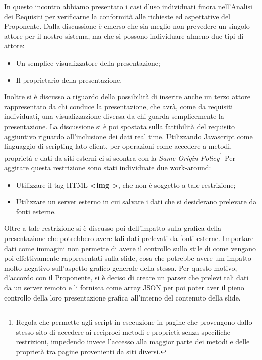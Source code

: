 In questo incontro abbiamo presentato i casi d'uso individuati finora nell'Analisi dei Requisiti per verificarne la conformità alle richieste ed aspettative del Proponente.
\noindent Dalla discussione è emerso che sia meglio non prevedere un singolo attore per il nostro sistema, ma che si possono individuare almeno due tipi di attore:
\begin{itemize}
	\item Un semplice visualizzatore della presentazione;
	\item Il proprietario della presentazione.
\end{itemize}
Inoltre si è discusso a riguardo della possibilità di inserire anche un terzo attore rappresentato da chi conduce la presentazione, che avrà, come da requisiti individuati, una visualizzazione diversa da chi guarda semplicemente la presentazione.
\noindent La discussione si è poi spostata sulla fattibilità del requisito aggiuntivo riguardo all'inclusione dei dati real time. Utilizzando Javascript come linguaggio di scripting lato client, per operazioni come accedere a metodi, proprietà e dati da siti esterni ci si scontra con la \textit{Same Origin Policy}\footnote{Regola che permette agli script in esecuzione in pagine che provengono dallo stesso sito di accedere ai reciproci metodi e proprietà senza specifiche restrizioni, impedendo invece l'accesso alla maggior parte dei metodi e delle proprietà tra pagine provenienti da siti diversi.}
Per aggirare questa restrizione sono stati individuate due work-around:
\begin{itemize}
	\item Utilizzare il tag HTML \textbf{<img >}, che non è soggetto a tale restrizione;
	\item Utilizzare un server esterno in cui salvare i dati che si desiderano prelevare da fonti esterne.
\end{itemize}   
Oltre a tale restrizione si è discusso poi dell'impatto sulla grafica della presentazione che potrebbero avere tali dati prelevati da fonti esterne. Importare dati come immagini non permette di avere il controllo sullo stile di come vengano poi effettivamente rappresentati sulla slide, cosa che potrebbe avere um impatto molto negativo sull'aspetto grafico generale della stessa. Per questo motivo, d'accordo con il Proponente, si è deciso di creare un parser che prelevi tali dati da un server remoto e li fornisca come array JSON per poi poter aver il pieno controllo della loro presentazione grafica all'interno del contenuto della slide.